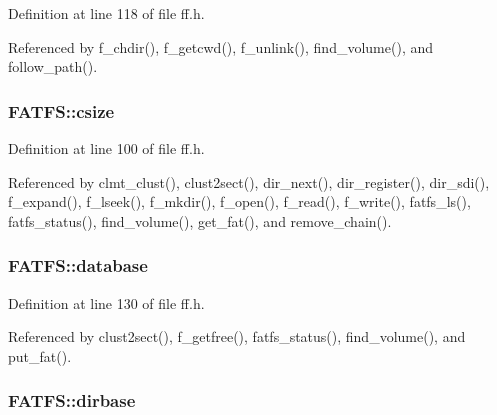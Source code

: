 Definition at line 118 of file ff.\+h.



Referenced by f\+\_\+chdir(), f\+\_\+getcwd(), f\+\_\+unlink(), find\+\_\+volume(), and follow\+\_\+path().

\subsubsection[{\texorpdfstring{csize}{csize}}]{ F\+A\+T\+F\+S\+::csize}\hypertarget{structFATFS_ad7fa7a509f8d097a9ab182d6c47be568}{}\label{structFATFS_ad7fa7a509f8d097a9ab182d6c47be568}


Definition at line 100 of file ff.\+h.



Referenced by clmt\+\_\+clust(), clust2sect(), dir\+\_\+next(), dir\+\_\+register(), dir\+\_\+sdi(), f\+\_\+expand(), f\+\_\+lseek(), f\+\_\+mkdir(), f\+\_\+open(), f\+\_\+read(), f\+\_\+write(), fatfs\+\_\+ls(), fatfs\+\_\+status(), find\+\_\+volume(), get\+\_\+fat(), and remove\+\_\+chain().

\subsubsection[{\texorpdfstring{database}{database}}]{ F\+A\+T\+F\+S\+::database}\hypertarget{structFATFS_a5b6c0bc2e9fd2ae8ef714210a74a2d5d}{}\label{structFATFS_a5b6c0bc2e9fd2ae8ef714210a74a2d5d}


Definition at line 130 of file ff.\+h.



Referenced by clust2sect(), f\+\_\+getfree(), fatfs\+\_\+status(), find\+\_\+volume(), and put\+\_\+fat().

\subsubsection[{\texorpdfstring{dirbase}{dirbase}}]{ F\+A\+T\+F\+S\+::dirbase}\hypertarget{structFATFS_a3f72fd998dbcce4652a85a81fe944bc4}{}\label{structFATFS_a3f72fd998dbcce4652a85a81fe944bc4}


